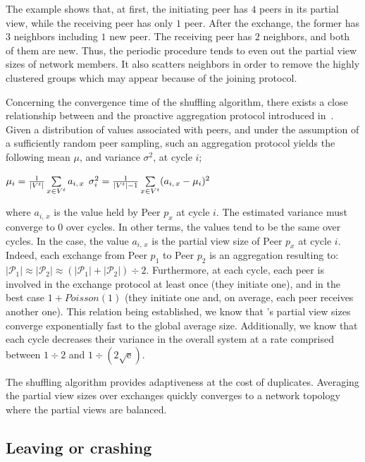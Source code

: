 The example shows that, at first, the initiating peer has $4$ peers in
its partial view, while the receiving peer has only $1$ peer.
After the exchange, the former has $3$ neighbors including $1$ new
peer. The receiving peer has $2$ neighbors, and both of them are
new. Thus, the periodic procedure tends to even out the partial view
sizes of network members. It also scatters neighbors in order to remove
the highly clustered groups which may appear because of the joining
protocol.

Concerning the convergence time of the shuffling algorithm, there
exists a close relationship between \SPRAY and the proactive
aggregation protocol introduced
in~\cite{jelasity2004epidemic}. Given a
distribution of values associated with peers, and under the assumption
of a sufficiently random peer sampling, such an aggregation protocol
yields the following mean $\mu$, and variance $\sigma^2$, at cycle
$i$;
\begin{center}
  $\mu_i = {1\over{|V^t|}} \sum\limits_{x \in V^t} a_{i,\,x}$
  \hfill
  $\sigma^2_i = {1\over{|V^t|-1}}\sum\limits_{x \in V^t}
  (a_{i,\,x} - \mu_i)^2$
\end{center}
where $a_{i,\,x}$ is the value held by Peer $p_x$ at cycle $i$. The
estimated variance must converge to $0$ over cycles. In other terms,
the values tend to be the same over cycles. In the \SPRAY case, the
value $a_{i,\,x}$ is the partial view size of Peer $p_x$ at cycle
$i$. Indeed, each exchange from Peer $p_1$ to Peer $p_2$ is an
aggregation resulting to:
$|\mathcal{P}_1|\approx|\mathcal{P}_2|\approx{(|\mathcal{P}_1| +
  |\mathcal{P}_2|) \div 2}$.  Furthermore, at each cycle, each peer is
involved in the exchange protocol at least once (they initiate one),
and in the best case $1+Poisson(1)$ (they initiate one and, on average,
each peer receives another one). This relation being established, we
know that \SPRAY's partial view sizes converge exponentially fast to
the global average size. Additionally, we know that each cycle
decreases their variance in the overall system at a rate comprised
between ${1\div 2}$ and $1\div ({2\sqrt{\text{e}}})$.

The shuffling algorithm provides adaptiveness at the cost of
duplicates. Averaging the partial view sizes over exchanges quickly
converges to a network topology where the partial views are balanced.

\subsection{Leaving or crashing}
\label{subsec:leaving}

